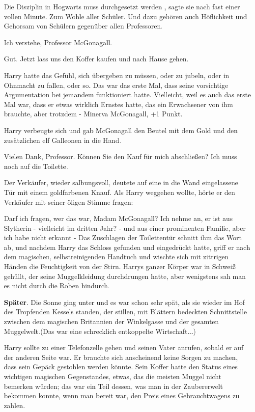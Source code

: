 \glqq Die Disziplin in Hogwarts muss durchgesetzt werden\grqq{} , sagte sie nach
fast einer vollen Minute. \glqq Zum Wohle aller Schüler. Und dazu gehören
auch Höflichkeit und Gehorsam von Schülern gegenüber allen
Professoren.\grqq{}

\glqq Ich verstehe, Professor McGonagall.\grqq{}

\glqq Gut. Jetzt lass uns den Koffer kaufen und nach Hause gehen.\grqq{}

Harry hatte das Gefühl, sich übergeben zu müssen, oder zu jubeln, oder in
Ohnmacht zu fallen, oder so. Das war das erste Mal, dass seine vorsichtige
Argumentation bei jemandem funktioniert hatte. Vielleicht, weil es auch das
erste Mal war, dass er etwas wirklich Ernstes hatte, das ein Erwachsener von
ihm brauchte, aber trotzdem - Minerva McGonagall, +1 Punkt.

Harry verbeugte sich und gab McGonagall den Beutel mit dem Gold und den
zusätzlichen elf Galleonen in die Hand.

\glqq Vielen Dank, Professor. Können Sie den Kauf für mich abschließen? Ich muss
noch auf die Toilette.\grqq{}

Der Verkäufer, wieder salbungsvoll, deutete auf eine in die Wand eingelassene
Tür mit einem goldfarbenen Knauf. Als Harry weggehen wollte, hörte er den
Verkäufer mit seiner öligen Stimme fragen:

\glqq Darf ich fragen, wer das war, Madam McGonagall? Ich nehme an, er ist aus
Slytherin - vielleicht im dritten Jahr? - und aus einer prominenten Familie,
aber ich habe nicht erkannt -\grqq{} Das Zuschlagen der Toilettentür schnitt
ihm das Wort ab, und nachdem Harry das Schloss gefunden und eingedrückt
hatte, griff er nach dem magischen, selbstreinigenden Handtuch und wischte
sich mit zittrigen Händen die Feuchtigkeit von der Stirn. Harrys ganzer
Körper war in Schweiß gehüllt, der seine Muggelkleidung durchdrungen hatte,
aber wenigstens sah man es nicht durch die Roben hindurch.

\textbf{Später}. Die Sonne ging unter und es war schon sehr spät, als
sie wieder im Hof des Tropfenden Kessels standen, der stillen, mit Blättern
bedeckten Schnittstelle zwischen dem magischen Britannien der Winkelgasse und
der gesamten Muggelwelt.(Das war eine schrecklich entkoppelte Wirtschaft...)

Harry sollte zu einer Telefonzelle gehen und seinen Vater anrufen, sobald er auf
der anderen Seite war. Er brauchte sich anscheinend keine Sorgen zu machen,
dass sein Gepäck gestohlen werden könnte. Sein Koffer hatte den Status eines
wichtigen magischen Gegenstandes, etwas, das die meisten Muggel nicht
bemerken würden; das war ein Teil dessen, was man in der Zaubererwelt
bekommen konnte, wenn man bereit war, den Preis eines Gebrauchtwagens zu
zahlen.

